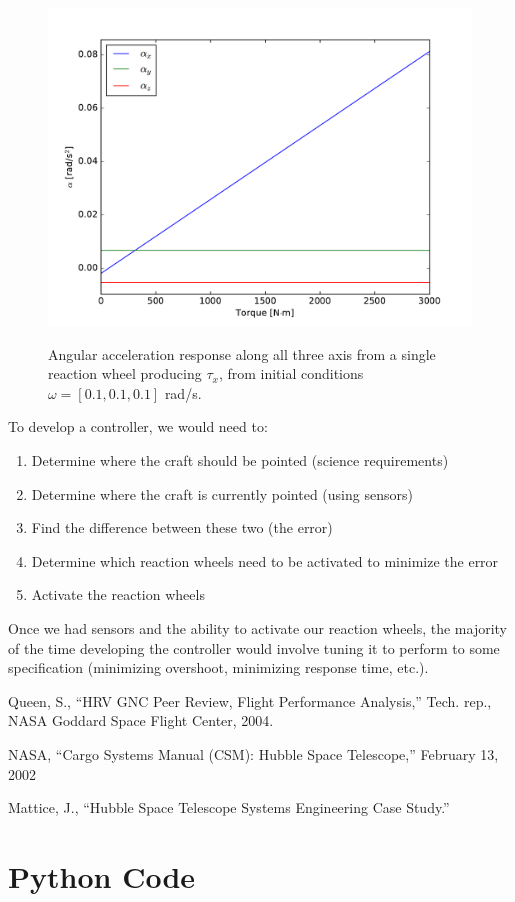 \documentclass[onecolumn,10pt]{jhwhw}
\begin{document}
\begin{figure}[h!]
\begin{center}
\includegraphics[height=0.4\textheight]{figure4.pdf}
\label{fig:on}
\end{center}
\caption{Angular acceleration response along all three axis from a single reaction wheel producing $\tau_x$, from initial conditions $\omega = [0.1, 0.1, 0.1]$ rad/s.}
\end{figure}

\clearpage
{}

To develop a controller, we would need to:
\begin{enumerate}
\item Determine where the craft should be pointed (science requirements)
\item Determine where the craft is currently pointed (using sensors)
\item Find the difference between these two (the error)
\item Determine which reaction wheels need to be activated to minimize the error
\item Activate the reaction wheels
\end{enumerate}

Once we had sensors and the ability to activate our reaction wheels, the majority of the time developing the controller would involve tuning it to perform to some specification (minimizing overshoot, minimizing response time, etc.).


\begin{thebibliography}{1}
Queen, S., ``HRV GNC Peer Review, Flight Performance Analysis,'' Tech. rep., NASA Goddard Space Flight Center, 2004.

NASA, ``Cargo Systems Manual (CSM): Hubble Space Telescope,'' February 13, 2002

Mattice, J., ``Hubble Space Telescope Systems Engineering Case Study.''
\end{thebibliography}

\appendix
\section{Python Code}

\end{document}
